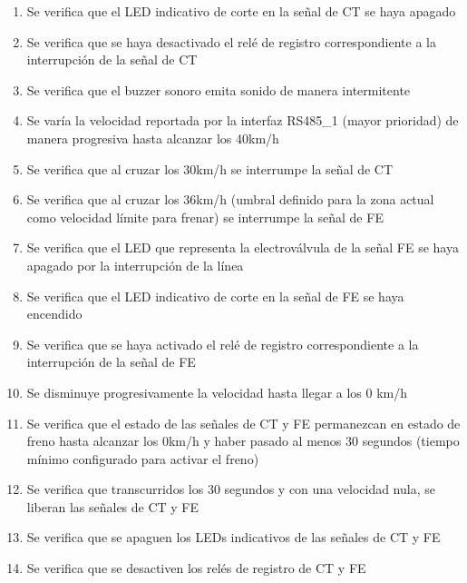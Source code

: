 \begin{enumerate}
\item	Se verifica que el LED indicativo de corte en la señal de CT se haya apagado
\item	Se verifica que se haya desactivado el relé de registro correspondiente a la interrupción de la señal de CT
\item	Se verifica que el buzzer sonoro emita sonido de manera intermitente
\item	Se varía la velocidad reportada por la interfaz RS485\_1 (mayor prioridad) de manera progresiva hasta alcanzar los 40km/h
\item	Se verifica que al cruzar los 30km/h se interrumpe la señal de CT
\item	Se verifica que al cruzar los 36km/h (umbral definido para la zona actual como velocidad límite para frenar) se interrumpe la señal de FE
\item	Se verifica que el LED que representa la electroválvula de la señal FE se haya apagado por la interrupción de la línea
\item	Se verifica que el LED indicativo de corte en la señal de FE se haya encendido
\item	Se verifica que se haya activado el relé de registro correspondiente a la interrupción de la señal de FE
\item	Se disminuye progresivamente la velocidad hasta llegar a los 0 km/h
\item	Se verifica que el estado de las señales de CT y FE permanezcan en estado de freno hasta alcanzar los 0km/h y haber pasado al menos 30 segundos (tiempo mínimo configurado para activar el freno)
\item	Se verifica que transcurridos los 30 segundos y con una velocidad nula, se liberan las señales de CT y FE
\item	Se verifica que se apaguen los LEDs indicativos de las señales de CT y FE
\item	Se verifica que se desactiven los relés de registro de CT y FE

\end{enumerate}

